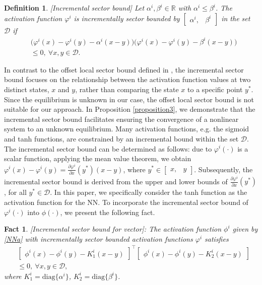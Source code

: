 \documentclass[journal,twoside,web]{ieeecolor}
\newtheorem{definition}         [theorem]{Definition}
\newtheorem{fact}         [theorem]{Fact}
\newcommand{\bbm}[1]{\left[\begin{matrix} #1 \end{matrix}\right]}
\begin{document}
\begin{definition}\label{definition1}[Incremental sector bound]
Let $\alpha^i, \beta^i\in \mathbb{R}$ with $\alpha^i\leq \beta^i$. The activation function $\varphi^i$ is incrementally sector bounded by $\bbm{\alpha^i,&\beta^i}$ in the set $\mathcal{D}$ if
\begin{equation}\label{ISB}
 \begin{aligned}
&\Big(\varphi^i(x)-\varphi^i(y)-\alpha^i(x-y)\Big) \Big(\varphi^i(x)-\varphi^i(y)-\beta^i(x-y)\Big)\\&\leq 0, \   \forall x, y\in \mathcal{D}.
\end{aligned}
\end{equation}
\end{definition}

In contrast to the offset local sector bound defined in \cite[Def. 4]{yin2021stability}, the incremental sector bound focuses on the relationship between the activation function values at two distinct states, $x$ and $y$, rather than comparing the state $x$ to a specific point $y^*$. Since the equilibrium is unknown in our case, the offset local sector bound is not suitable for our approach. In Proposition \ref{proposition3}, we demonstrate that the incremental sector bound facilitates ensuring the convergence of a nonlinear system to an unknown equilibrium. Many activation functions, e.g. the sigmoid and tanh functions, are constrained by an incremental bound within the set $\mathcal{D}$. %
The incremental sector bound can be determined as follows: due to $\varphi^{i}(\cdot)$ is a scalar function, applying the mean value theorem, we obtain $\varphi^i(x)-\varphi^i(y)=\frac{\partial \varphi^i}{\partial x} (y^*)(x-y)$, where $y^*\in \bbm{x,&y }$. Subsequently, the incremental sector bound is derived from the upper and lower bounds of $\frac{\partial \varphi^i}{\partial x} (y^*)$, for all $y^*\in\mathcal{D}$. In this paper, we specifically consider the tanh function as the activation function for the NN. To incorporate the incremental sector bound of $\varphi^{i}(\cdot)$ into $\phi(\cdot)$, we present the following fact.
\begin{fact}
 \label{fact1}[Incremental sector bound for vector]: 
The activation function $\phi^i$ given by \eqref{NNa} with incrementally sector bounded activation functions $\varphi^i$ satisfies
\begin{equation}\label{ISBV}
\begin{aligned}
&\bbm{\phi^i(x)-\phi^i(y)-K_1^i (x-y)}^\top\bbm{\phi^i(x)-\phi^i(y)-K_2^i(x-y)}\\&\leq 0, \  \forall x, y\in \mathcal{D},
\end{aligned}
\end{equation}
where $K_1^i =\mathrm{diag}\{\alpha^i\}$, $K_2^i =\mathrm{diag}\{\beta^i\}$.
\end{fact}
\end{document}
